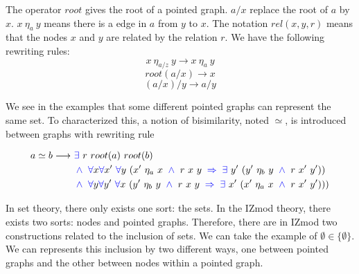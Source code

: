\documentclass[a4paper]{article}
\begin{document}
The operator $root$ gives the root of a pointed graph. $a/x$ replace the root of $a$ by $x$. $x~\eta_a~y$ means there is a edge in $a$ from $y$ to $x$. The notation $rel(x,y,r)$ means that the nodes $x$ and $y$ are related by the relation $r$. We have the following rewriting rules:
$$ x \ \eta_{a/z} \ y \longrightarrow x \ \eta_a \ y $$
$$ root(a/x) \longrightarrow x $$
$$ (a/x)/y \longrightarrow a/y $$

We see in the examples that some different pointed graphs can represent the same set. To characterized this, a notion of  bisimilarity, noted $\simeq$, is introduced between graphs with rewriting rule 

\begin{equation*}
\begin{split}
a \simeq b \longrightarrow~ &{\color{blue} \exists}~r~root(a)~root(b) \\
&\mathbin{\color{blue} \wedge} \ {\color{blue} \forall} x {\color{blue} \forall} x'~{\color{blue} \forall} y~(x'~\eta_a~x~\mathbin{\color{blue} \wedge}~r~x~y~\mathbin{\color{blue} \Rightarrow}~{\color{blue} \exists}~y'~(y'~\eta_b~y~\mathbin{\color{blue} \wedge}~r~x'~y')) \\
&\mathbin{\color{blue} \wedge} \ {\color{blue} \forall} y {\color{blue} \forall} y'~{\color{blue} \forall} x~(y'~\eta_b~y~\mathbin{\color{blue} \wedge}~r~x~y~\mathbin{\color{blue} \Rightarrow}~{\color{blue} \exists}~x'~(x'~\eta_a~x~\mathbin{\color{blue} \wedge}~r~x'~y')))
\end{split}
\end{equation*}

\begin{figure}[h]
\centering
{}
\end{figure}

In set theory, there only exists one sort: the sets. In the IZmod theory, there exists two sorts: nodes and pointed graphs. Therefore, there are in IZmod two constructions related to the inclusion of sets. We can take the example of $\emptyset \in \{\emptyset\}$. We can represents this inclusion by two different ways, one between pointed graphs and the other between nodes within a pointed graph.
\end{document}
